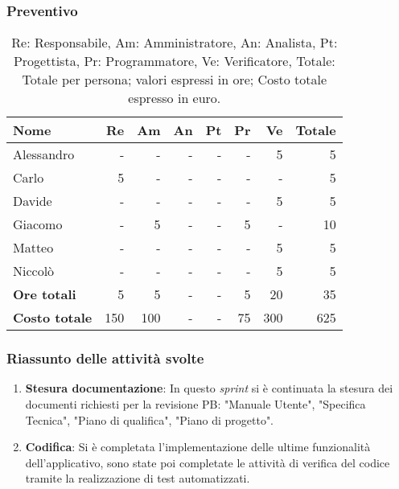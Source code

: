 \subsubsection{Preventivo}

\begin{table}[H]
	\centering
	\begin{tabular}{l|r|r|r|r|r|r|r}
		\textbf{Nome}         & \textbf{Re} & \textbf{Am} & \textbf{An} & \textbf{Pt} & \textbf{Pr} & \textbf{Ve} & \textbf{Totale} \\
		\hline
		Alessandro            & -           & -           & -           & -           & -           & 5           & 5               \\
		Carlo                 & 5           & -           & -           & -           & -           & -           & 5               \\
		Davide                & -           & -           & -           & -           & -           & 5           & 5               \\
		Giacomo               & -           & 5           & -           & -           & 5           & -           & 10              \\
		Matteo                & -           & -           & -           & -           & -           & 5           & 5               \\
		Niccolò               & -           & -           & -           & -           & -           & 5           & 5               \\
		\hline
		\textbf{Ore totali}   & 5           & 5           & -           & -           & 5           & 20          & 35              \\
		\textbf{Costo totale} & 150         & 100         & -           & -           & 75          & 300         & 625
	\end{tabular}
	\caption{Re: Responsabile, Am: Amministratore, An: Analista, Pt: Progettista,
		Pr: Programmatore, Ve: Verificatore, Totale: Totale per persona; valori espressi in ore; Costo totale espresso in euro.}
\end{table}

\subsubsection{Riassunto delle attività svolte}

\begin{enumerate}
	\item \textbf{Stesura documentazione}: In questo \textit{sprint} si è continuata la stesura dei documenti richiesti per la revisione PB: "Manuale Utente", "Specifica Tecnica", "Piano di qualifica", "Piano di progetto".

	\item \textbf{Codifica}: Si è completata l'implementazione delle ultime funzionalità dell'applicativo, sono state poi completate le attività di verifica del codice tramite la realizzazione di test automatizzati.
\end{enumerate}

